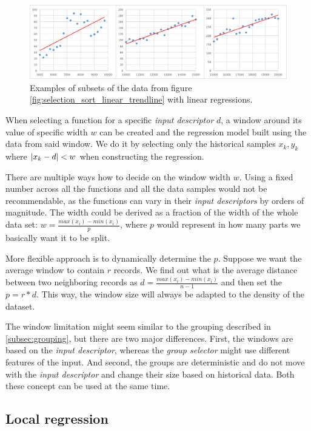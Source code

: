 \begin{figure}[h!]
	\captionsetup{justification=centering,margin=0.5cm}
	\centerline{\mbox{\includegraphics[width=140mm]{./img/window_examples.png}}}
	\caption{Examples of subsets of the data from figure \ref{fig:selection_sort_linear_trendline} with linear regressions.}
	\label{fig:window_examples}
\end{figure}

When selecting a function for a specific \textit{input descriptor} $d$, a window around its value of specific width $w$ can be created and the regression model built using the data from said window. We do it by selecting only the historical samples $x_k, y_k$ where $\left|{x_k - d}\right| < w$ when constructing the regression.

There are multiple ways how to decide on the window width $w$. Using a fixed number across all the functions and all the data samples would not be recommendable, as the functions can vary in their \textit{input descriptors} by orders of magnitude. The width could be derived as a fraction of the width of the whole data set: $w = \frac{max(x_i) - min(x_i)}{p}$, where $p$ would represent in how many parts we basically want it to be split. 

More flexible approach is to dynamically determine the $p$. Suppose we want the average window to contain $r$ records. We find out what is the average distance between two neighboring records as $d =  \frac{max(x_i) - min(x_i)}{n - 1}$ and then set the $p = r * d$. This way, the window size will always be adapted to the density of the dataset.

The window limitation might seem similar to the grouping described in \ref{subsec:grouping}, but there are two major differences. First, the windows are based on the \textit{input descriptor}, whereas the \textit{group selector} might use different features of the input. And second, the groups are deterministic and do not move with the \textit{input descriptor} and change their size based on historical data. Both these concept can be used at the same time.

\subsection{Local regression}
\label{subsec:local_regression}

